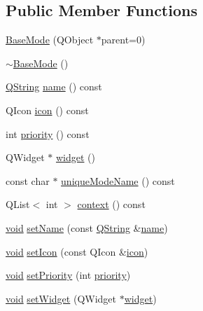\subsection*{\-Public \-Member \-Functions}
\begin{DoxyCompactItemize}
\item 
\hyperlink{group___core_plugin_ga001e234367e66731d03715a0d8aaa2a4}{\-Base\-Mode} (\-Q\-Object $\ast$parent=0)
\item 
\hyperlink{group___core_plugin_ga608e9b9a30ea7632f45add52726c8377}{$\sim$\-Base\-Mode} ()
\item 
\hyperlink{group___u_a_v_objects_plugin_gab9d252f49c333c94a72f97ce3105a32d}{\-Q\-String} \hyperlink{group___core_plugin_ga75b37730bea5a18036561c69d0e7ce85}{name} () const 
\item 
\-Q\-Icon \hyperlink{group___core_plugin_ga112e7a5d2e25d9a38cb8e52ec9f89431}{icon} () const 
\item 
int \hyperlink{group___core_plugin_ga078a908a836500c676c4acacee39ea94}{priority} () const 
\item 
\-Q\-Widget $\ast$ \hyperlink{group___core_plugin_ga458407ee9529a1d0067acd3e978ca63c}{widget} ()
\item 
const char $\ast$ \hyperlink{group___core_plugin_ga5712eab4028d979aa83e70cc8dd3962b}{unique\-Mode\-Name} () const 
\item 
\-Q\-List$<$ int $>$ \hyperlink{group___core_plugin_ga931f95d0ee3f352b7e43bbba9e228480}{context} () const 
\item 
\hyperlink{group___u_a_v_objects_plugin_ga444cf2ff3f0ecbe028adce838d373f5c}{void} \hyperlink{group___core_plugin_ga77607e4c61894e21f5891306d0250810}{set\-Name} (const \hyperlink{group___u_a_v_objects_plugin_gab9d252f49c333c94a72f97ce3105a32d}{\-Q\-String} \&\hyperlink{group___core_plugin_ga75b37730bea5a18036561c69d0e7ce85}{name})
\item 
\hyperlink{group___u_a_v_objects_plugin_ga444cf2ff3f0ecbe028adce838d373f5c}{void} \hyperlink{group___core_plugin_gab9476a9a42bf5a928acb87d58b6e056c}{set\-Icon} (const \-Q\-Icon \&\hyperlink{group___core_plugin_ga112e7a5d2e25d9a38cb8e52ec9f89431}{icon})
\item 
\hyperlink{group___u_a_v_objects_plugin_ga444cf2ff3f0ecbe028adce838d373f5c}{void} \hyperlink{group___core_plugin_ga2c502184a77125dd76a4a78170257259}{set\-Priority} (int \hyperlink{group___core_plugin_ga078a908a836500c676c4acacee39ea94}{priority})
\item 
\hyperlink{group___u_a_v_objects_plugin_ga444cf2ff3f0ecbe028adce838d373f5c}{void} \hyperlink{group___core_plugin_gab1cdd30e6cb316270fb623edf88388ff}{set\-Widget} (\-Q\-Widget $\ast$\hyperlink{group___core_plugin_ga458407ee9529a1d0067acd3e978ca63c}{widget})

\end{DoxyCompactItemize}
